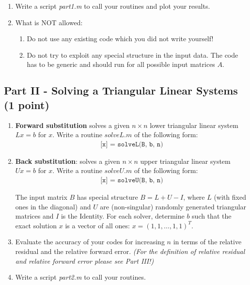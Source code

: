 \documentclass{scrartcl}
\begin{document}
\begin{enumerate}
        \item Write a script \textit{part1.m} to call your routines and plot your results.
      
        
        \item What is NOT allowed:
            \begin{enumerate}
                \item Do not use any existing code which you did not write yourself!
                \item Do not try to exploit any special structure in the input data. The code has to be generic and should run for all possible input matrices $A$.
            \end{enumerate}
    \end{enumerate}
    
    \subsection*{Part II - Solving a Triangular Linear Systems (1 point)}
        \begin{enumerate}
            \item \textbf{Forward substitution} solves a given $n \times n$ lower triangular linear system $Lx = b$ for $x$. Write a routine $solveL.m$ of the following form: 
            \begin{align*}
            \texttt{[x] = solveL(B, b, n)}
			\end{align*}
            \item \textbf{Back substitution}: solves a given $n \times n$ upper triangular linear system $Ux = b$ for $x$. Write a routine $solveU.m$ of the following form: 
            \begin{align*}
\texttt{[x] = solveU(B, b, n)}
			\end{align*}			
			
            

The input matrix $B$ has special structure $B = L + U - I$, where $L$ (with fixed ones in the diagonal) and $U$ are (non-singular) randomly generated triangular matrices and $I$ is the Identity. For each solver, determine $b$ such that the exact solution $x$ is a vector of all ones: $x = (1, 1, \dots, 1, 1)^{T}$.
			\item Evaluate the accuracy of your codes for increasing $n$ in terms of the relative residual and the relative forward error. \emph{(For the definition of relative residual and relative forward error please see Part III!)}

           	\item Write a script \textit{part2.m} to call your routines.
        \end{enumerate}
\end{document}
